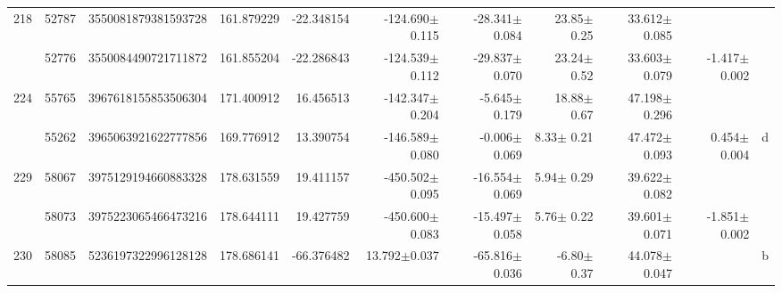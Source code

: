 \documentclass{ws-ijmpd}
\begin{document}
\begin{landscape}
\begin{longtable}{rrrrrrrrrrl}
 \hline 218 &   52787 &      3550081879381593728 &                   161.879229 &                   -22.348154 &               -124.690$\pm$0.115 &                -28.341$\pm$0.084 &          23.85$\pm$  0.25 &        33.612$\pm$0.085 &                                           &                                                    \\
            &   52776 &      3550084490721711872 &                   161.855204 &                   -22.286843 &               -124.539$\pm$0.112 &                -29.837$\pm$0.070 &          23.24$\pm$  0.52 &        33.603$\pm$0.079 &                          -1.417$\pm$0.002 &                                                    \\
 \hline 224 &   55765 &      3967618155853506304 &                   171.400912 &                    16.456513 &               -142.347$\pm$0.204 &                 -5.645$\pm$0.179 &          18.88$\pm$  0.67 &        47.198$\pm$0.296 &                                           &                                                    \\
            &   55262 &      3965063921622777856 &                   169.776912 &                    13.390754 &               -146.589$\pm$0.080 &                 -0.006$\pm$0.069 &           8.33$\pm$  0.21 &        47.472$\pm$0.093 &                           0.454$\pm$0.004 &                                                  d \\
 \hline 229 &   58067 &      3975129194660883328 &                   178.631559 &                    19.411157 &               -450.502$\pm$0.095 &                -16.554$\pm$0.069 &           5.94$\pm$  0.29 &        39.622$\pm$0.082 &                                           &                                                    \\
            &   58073 &      3975223065466473216 &                   178.644111 &                    19.427759 &               -450.600$\pm$0.083 &                -15.497$\pm$0.058 &           5.76$\pm$  0.22 &        39.601$\pm$0.071 &                          -1.851$\pm$0.002 &                                                    \\
 \hline 230 &   58085 &      5236197322996128128 &                   178.686141 &                   -66.376482 &                 13.792$\pm$0.037 &                -65.816$\pm$0.036 &          -6.80$\pm$  0.37 &        44.078$\pm$0.047 &                                           &                                                  b \\

\end{longtable}
\end{landscape}
\end{document}
